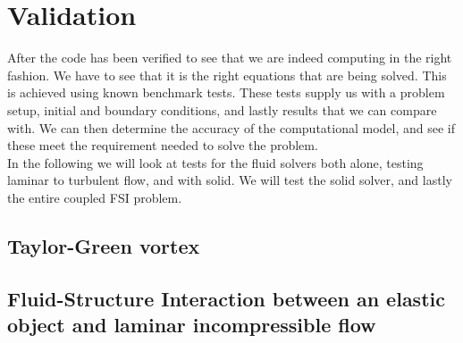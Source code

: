 \section{Validation}
After the code has been verified to see that we are indeed computing in the right fashion. We have to see that it is the right equations that are being solved. This is achieved using known benchmark tests. These tests supply us with a problem setup, initial and boundary conditions, and lastly results that we can compare with. We can then determine the accuracy of the computational model, and see if these meet the requirement needed to solve the problem. \cite{Selin2014} \\
In the following we will look at tests for the fluid solvers both alone, testing laminar to turbulent flow, and with solid. We will test the solid solver, and lastly the entire coupled FSI problem. 
\subsection{Taylor-Green vortex}

\subsection{Fluid-Structure Interaction between an elastic object and laminar incompressible flow}


